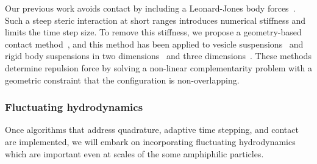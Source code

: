 Our previous work avoids contact by including a Leonard-Jones body
forces~\cite{Fu2018_SIAM}. Such a steep steric interaction at short ranges
introduces numerical stiffness and limits the time step size. To
remove this stiffness, we propose a geometry-based contact
method~\cite{har-pon-sor-zor2011}, and this method has been applied to
vesicle suspensions~\cite{lu-rah-zor2017} and rigid body suspensions in
two dimensions~\cite{bys-sha-qua2020} and three
dimensions~\cite{Yan2019}. These methods determine repulsion force by
solving a non-linear complementarity problem with a geometric constraint
that the configuration is non-overlapping.


\subsubsection{Fluctuating hydrodynamics}
\label{subsec:fluctuating}
Once algorithms that address quadrature, adaptive time stepping, and
contact are implemented, we will embark on incorporating fluctuating
hydrodynamics~\cite{Bao17,Bao18} which are important even at scales of
the some amphiphilic particles.





